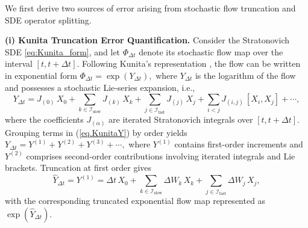 \documentclass{article}
\newtheorem{theorem}{Theorem}
\begin{document}

We first derive two sources of error arising from stochastic flow truncation and SDE operator splitting.

\textbf{(i) Kunita Truncation Error Quantification.}
Consider the Stratonovich SDE \eqref{eq:Kunita_form}, and let $\Phi_{\Delta t}$
denote its stochastic flow map over the interval $[t, t+\Delta t]$. Following Kunita's
representation \cite{kunita1990stochastic}, the flow can be written in exponential form
\(
\Phi_{\Delta t} = \exp(Y_{\Delta t}),
\)
where $Y_{\Delta t}$ is  the logarithm of the flow and possesses a stochastic Lie‑series expansion, i.e.,
\begin{equation}
Y_{\Delta t}
= J_{(0)}\, X_0
+ \sum_{k\in\mathcal{I}_{\mathrm{slow}}} J_{(k)}\, X_k
+ \sum_{j\in\mathcal{I}_{\mathrm{fast}}} J_{(j)}\, X_j
+ \sum_{i<j} J_{(i,j)}\, [X_i, X_j]
+ \cdots ,
\label{eq.KunitaY}
\end{equation}
where the coefficients $J_{(\alpha)}$ are iterated Stratonovich integrals
over $[t, t+\Delta t]$. 
Grouping terms in (\ref{eq.KunitaY}) by order yields
\(
Y_{\Delta t} = Y^{(1)} + Y^{(2)} + Y^{(3)} + \cdots,
\)
where $Y^{(1)}$ contains first-order increments and $Y^{(2)}$ comprises second‑order contributions involving iterated integrals and Lie brackets. Truncation at first order %
gives
\begin{equation}
\label{formula:truncate}
    \hat{Y}_{\Delta t} = Y^{(1)}
= \Delta t\,X_0
+ \sum_{k\in\mathcal{I}_{\mathrm{slow}}} \Delta W_k\,X_k
+ \sum_{j\in\mathcal{I}_{\mathrm{fast}}} \Delta W_j\,X_j,
\end{equation}
with the corresponding truncated exponential flow map represented as $\exp(\hat{Y}_{\Delta t})$.

\end{document}
